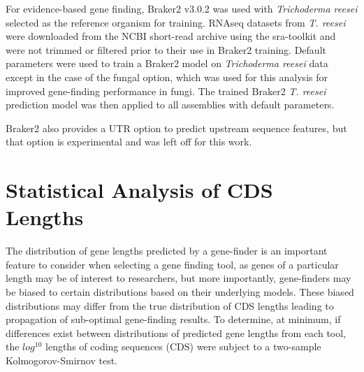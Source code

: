 For evidence-based gene finding, Braker2 v3.0.2\cite{Bruna2021} was
used with \textit{Trichoderma reesei} selected as the reference
organism for training. RNAseq datasets from \textit{T. reesei} were
downloaded from the NCBI short-read archive using the
sra-toolkit\cite{NCBI2025} and were not trimmed or filtered prior to
their use in Braker2 training. Default parameters were used to train a
Braker2 model on \textit{Trichoderma reesei} data except in the case
of the fungal option, which was used for this analysis for improved
gene-finding performance in fungi. The trained Braker2
\textit{T. reesei} prediction model was then applied to all assemblies
with default parameters.

Braker2 also provides a UTR option to predict upstream sequence
features, but that option is experimental and was left off for this
work.


\section{Statistical Analysis of CDS Lengths}
\label{met:cds-stats}
The distribution of gene lengths predicted by a gene-finder is an
important feature to consider when selecting a gene finding tool, as
genes of a particular length may be of interest to researchers, but
more importantly, gene-finders may be biased to certain distributions
based on their underlying models. These biased distributions may
differ from the true distribution of CDS lengths leading to
propagation of sub-optimal gene-finding results. To determine, at
minimum, if differences exist between distributions of predicted gene
lengths from each tool, the $log^10$ lengths of coding sequences (CDS)
were subject to a two-sample Kolmogorov-Smirnov test\cite{ref1}. 

